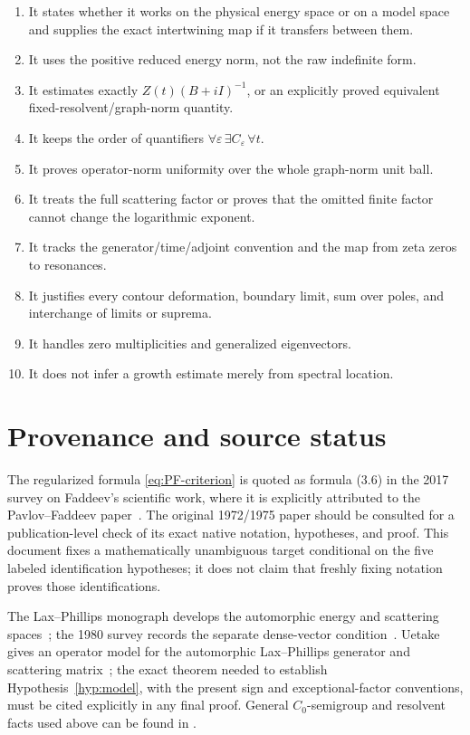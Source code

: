 \documentclass[11pt]{amsart}
\theoremstyle{definition}
\theoremstyle{remark}
\newcommand{\eps}{\varepsilon}
\begin{document}
\begin{enumerate}[label=(A\arabic*)]
 \item It states whether it works on the physical energy space or on a model
       space and supplies the exact intertwining map if it transfers between
       them.
 \item It uses the positive reduced energy norm, not the raw indefinite form.
 \item It estimates exactly $Z(t)(B+iI)^{-1}$, or an explicitly proved
       equivalent fixed-resolvent/graph-norm quantity.
 \item It keeps the order of quantifiers
       $\forall\eps\,\exists C_{\eps}\,\forall t$.
 \item It proves operator-norm uniformity over the whole graph-norm unit ball.
 \item It treats the full scattering factor or proves that the omitted finite
       factor cannot change the logarithmic exponent.
 \item It tracks the generator/time/adjoint convention and the map from zeta
       zeros to resonances.
 \item It justifies every contour deformation, boundary limit, sum over poles,
       and interchange of limits or suprema.
 \item It handles zero multiplicities and generalized eigenvectors.
 \item It does not infer a growth estimate merely from spectral location.
\end{enumerate}

\section{Provenance and source status}

The regularized formula \eqref{eq:PF-criterion} is quoted as formula (3.6) in
the 2017 survey on Faddeev's scientific work, where it is explicitly attributed
to the Pavlov--Faddeev paper~\cite{TakhtajanEtAl2017,PavlovFaddeev1975}.  The
original 1972/1975 paper should be consulted for a publication-level check of
its exact native notation, hypotheses, and proof.  This document fixes a
mathematically unambiguous target conditional on the five labeled
identification hypotheses; it does not claim that freshly fixing notation
proves those identifications.

The Lax--Phillips monograph develops the automorphic energy and scattering
spaces~\cite{LaxPhillips1976}; the 1980 survey records the separate dense-vector
condition~\cite{LaxPhillips1980}.  Uetake gives an operator model for the
automorphic Lax--Phillips generator and scattering matrix~\cite{Uetake2007};
the exact theorem needed to establish Hypothesis~\ref{hyp:model}, with the
present sign and exceptional-factor conventions, must be cited explicitly in
any final proof.
General $C_{0}$-semigroup and resolvent facts used above can be found in
\cite{EngelNagel2000}.
\end{document}
